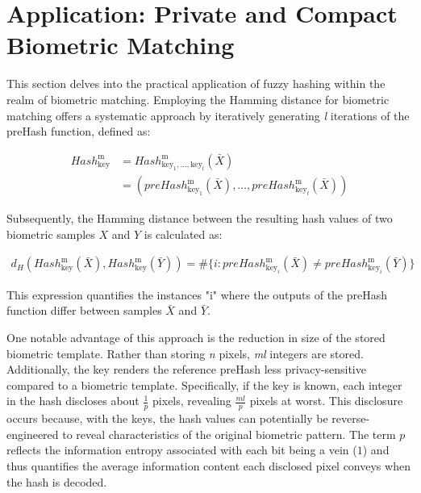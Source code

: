 \newpage
\section{Application: Private and Compact Biometric Matching}
\label{Application: Private and Compact Biometric Matching}

This section delves into the practical application of fuzzy hashing within the realm of biometric matching. Employing the Hamming distance for biometric matching offers a systematic approach by iteratively generating \textit{l} iterations of the preHash function, defined as:

\begin{equation}
    \begin{aligned}
        Hash_{\text{key}}^\text{m} &= Hash_{\text{key}_1, \ldots, \text{key}_l}^\text{m}(\bar{X})\\
        &= (preHash_{\text{key}_1}^\text{m}(\bar{X}), \ldots, preHash_{\text{key}_l}^\text{m}(\bar{X}))
    \end{aligned}
\end{equation}

Subsequently, the Hamming distance between the resulting hash values of two biometric samples \(X\) and \(Y\) is calculated as:

\begin{equation}
    \begin{aligned}
        \label{eq:HammingDist}
        d_H(Hash_{\text{key}}^\text{m}(\bar{X}), Hash_{\text{key}}^\text{m}(\bar{Y})) = \# \{i: preHash_{\text{key}_i}^\text{m}(\bar{X}) \neq preHash_{\text{key}_i}^\text{m}(\bar{Y})\}
    \end{aligned}
\end{equation}

This expression quantifies the instances "i" where the outputs of the preHash function differ between samples \(\bar{X}\) and \(\bar{Y}\).

One notable advantage of this approach is the reduction in size of the stored biometric template. Rather than storing \textit{n} pixels, \textit{ml} integers are stored. Additionally, the key renders the reference preHash less privacy-sensitive compared to a biometric template. Specifically, if the key is known, each integer in the hash discloses about \(\frac{1}{p}\) pixels, revealing \(\frac{ml}{p}\) pixels at worst. This disclosure occurs because, with the keys, the hash values can potentially be reverse-engineered to reveal characteristics of the original biometric pattern. The term \(p\)​ reflects the information entropy associated with each bit being a vein (\(1\)) and thus quantifies the average information content each disclosed pixel conveys when the hash is decoded.

